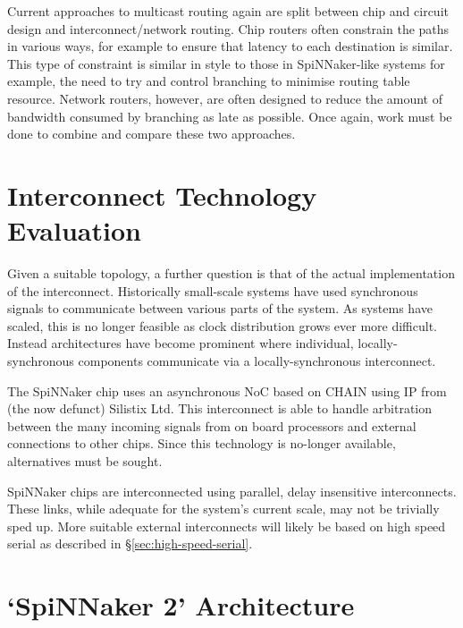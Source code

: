 		Current approaches to multicast routing again are split between chip and
		circuit design and interconnect/network routing. Chip routers often
		constrain the paths in various ways, for example to ensure that latency to
		each destination is similar. This type of constraint is similar in style to
		those in SpiNNaker-like systems for example, the need to try and control
		branching to minimise routing table resource. Network routers, however, are
		often designed to reduce the amount of bandwidth consumed by branching as
		late as possible. Once again, work must be done to combine and compare these
		two approaches.
	
	\section{Interconnect Technology Evaluation}
		
		
		Given a suitable topology, a further question is that of the actual
		implementation of the interconnect. Historically small-scale systems have
		used synchronous signals to communicate between various parts of the system.
		As systems have scaled, this is no longer feasible as clock distribution
		grows ever more difficult. Instead architectures have become prominent where
		individual, locally-synchronous components communicate via a
		locally-synchronous interconnect.
		
		The SpiNNaker chip uses an asynchronous NoC based on CHAIN
		\cite{plana07,bainbridge02} using IP from (the now defunct) Silistix Ltd.
		This interconnect is able to handle arbitration between the many incoming
		signals from on board processors and external connections to other chips.
		Since this technology is no-longer available, alternatives must be sought.
		
		SpiNNaker chips are interconnected using parallel, delay insensitive
		interconnects. These links, while adequate for the system's current scale,
		may not be trivially sped up. More suitable external interconnects will
		likely be based on high speed serial as described in
		\S\ref{sec:high-speed-serial}.
		
		\section{`SpiNNaker 2' Architecture}
		
		
